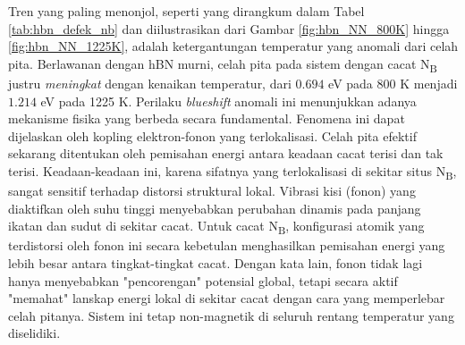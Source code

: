 Tren yang paling menonjol, seperti yang dirangkum dalam Tabel \ref{tab:hbn_defek_nb} dan diilustrasikan dari Gambar \ref{fig:hbn_NN_800K} hingga \ref{fig:hbn_NN_1225K}, adalah ketergantungan temperatur yang anomali dari celah pita.
Berlawanan dengan hBN murni, celah pita pada sistem dengan cacat N\textsubscript{B} justru \emph{meningkat} dengan kenaikan temperatur, dari $0.694$ eV pada 800 K menjadi $1.214$ eV pada 1225 K. Perilaku \emph{blueshift} anomali ini menunjukkan adanya mekanisme fisika yang berbeda secara fundamental.
Fenomena ini dapat dijelaskan oleh kopling elektron-fonon yang terlokalisasi. Celah pita efektif sekarang ditentukan oleh pemisahan energi antara keadaan cacat terisi dan tak terisi.
Keadaan-keadaan ini, karena sifatnya yang terlokalisasi di sekitar situs N\textsubscript{B}, sangat sensitif terhadap distorsi struktural lokal.
Vibrasi kisi (fonon) yang diaktifkan oleh suhu tinggi menyebabkan perubahan dinamis pada panjang ikatan dan sudut di sekitar cacat.
Untuk cacat N\textsubscript{B}, konfigurasi atomik yang terdistorsi oleh fonon ini secara kebetulan menghasilkan pemisahan energi yang lebih besar antara tingkat-tingkat cacat.
Dengan kata lain, fonon tidak lagi hanya menyebabkan "pencorengan" potensial global, tetapi secara aktif "memahat" lanskap energi lokal di sekitar cacat dengan cara yang memperlebar celah pitanya.
Sistem ini tetap non-magnetik di seluruh rentang temperatur yang diselidiki.

